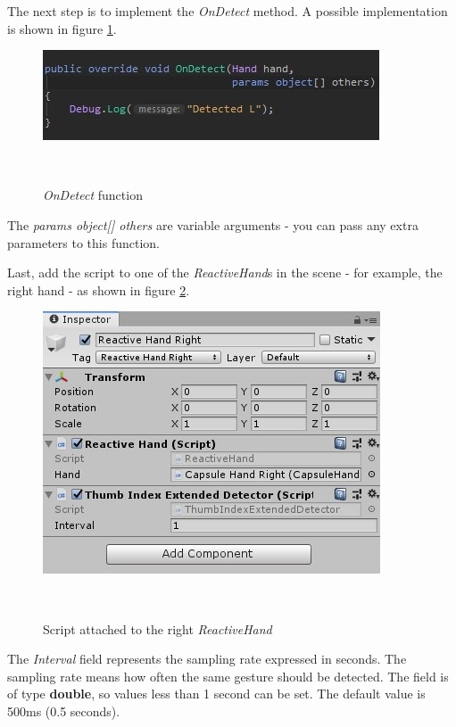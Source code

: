 \documentclass{sigchi}
\begin{document}
The next step is to implement the \textit{OnDetect} method. A possible implementation is shown in figure \ref{fig:figure9}.

\begin{figure}[h]
  \centering
  \includegraphics[width=0.9\columnwidth]{figures/FluentMotion_onDetect}
  \caption{\textit{OnDetect} function}~\label{fig:figure9}
\end{figure}

The \textit{params object[] others} are variable arguments - you can pass any extra parameters to this function.


Last, add the script to one of the \textit{ReactiveHand}s in the scene - for example, the right hand - as shown in figure \ref{fig:figure10}. 

\begin{figure}[h]
  \centering
  \includegraphics[width=0.9\columnwidth]{figures/FluentMotion_script_attached}
  \caption{Script attached to the right \textit{ReactiveHand}}~\label{fig:figure10}
\end{figure}

The \textit{Interval} field represents the sampling rate expressed in seconds. The sampling rate means how often the same gesture should be detected. The field is of type \textbf{double}, so values less than 1 second can be set. The default value is 500ms (0.5 seconds).
\end{document}
